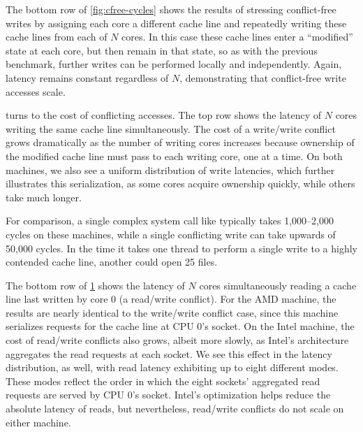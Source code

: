 The bottom row of \cref{fig:cfree-cycles} shows the results of
stressing conflict-free writes by assigning each core a different
cache line and repeatedly writing these cache lines from each of $N$
cores.  In this case these cache lines enter a ``modified'' state at
each core, but then remain in that state, so as with the previous
benchmark, further writes can be performed locally and independently.
%
Again, latency remains constant regardless of $N$, demonstrating that
conflict-free write accesses scale.

\begin{figure}
  \centering
  \label{fig:conflict-cycles}
\end{figure}

 turns to the cost of conflicting
accesses.  The top row shows the latency of $N$ cores writing the same
cache line simultaneously.  The cost of a write/write conflict grows
dramatically as the number of writing cores increases because
ownership of the modified cache line must pass to each writing
core, one at a time.  On both machines, we also see a uniform
distribution of write latencies, which further illustrates this
serialization, as some cores acquire ownership quickly, while others
take much longer.

For comparison, a single complex system call like 
typically takes 1,000--2,000 cycles on these machines, while a single
conflicting write can take upwards of 50,000 cycles.
%
In the time it takes one thread to perform a single write to a highly
contended cache line, another could open 25 files.


The bottom row of \cref{fig:conflict-cycles} shows the latency of $N$
cores simultaneously reading a cache line last written by core 0 (a
read/write conflict).  For the AMD machine, the results are nearly
identical to the write/write conflict case, since this machine
serializes requests for the cache line at CPU 0's socket.  On the
Intel machine, the cost of read/write conflicts also grows, albeit
more slowly, as Intel's architecture aggregates the read requests at
each socket.
%
We see this effect in the latency distribution, as well, with read
latency exhibiting up to eight different modes.  These modes reflect
the order in which the eight sockets' aggregated read requests are
served by CPU 0's socket.
Intel's optimization helps reduce the absolute
latency of reads, but nevertheless, read/write conflicts do not scale
on either machine.


